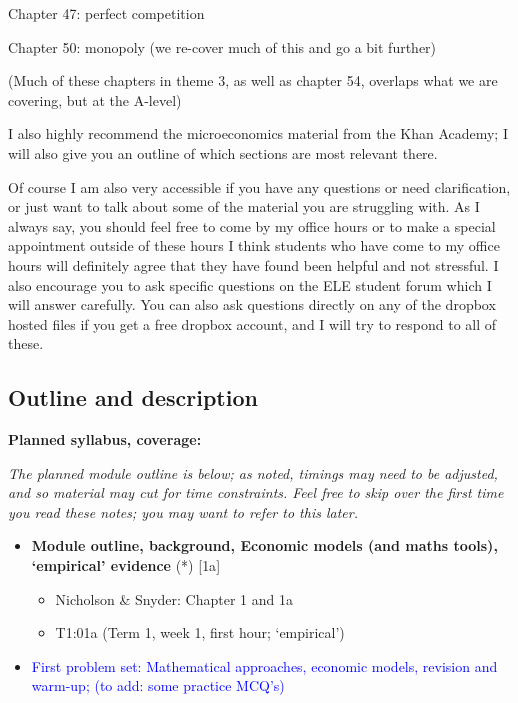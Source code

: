 \documentclass[]{article}
\providecommand{\tightlist}{%
  \setlength{\itemsep}{0pt}\setlength{\parskip}{0pt}}
\begin{document}
Chapter 47: perfect competition

Chapter 50: monopoly (we re-cover much of this and go a bit further)

(Much of these chapters in theme 3, as well as chapter 54, overlaps what we are covering, but at the A-level)

I also highly recommend the microeconomics material from the Khan Academy; I will also give you an outline of which sections are most relevant there.

Of course I am also very accessible if you have any questions or need clarification, or just want to talk about some of the material you are struggling with. As I always say, you should feel free to come by my office hours or to make a special appointment outside of these hours I think students who have come to my office hours will definitely agree that they have found been helpful and not stressful. I also encourage you to ask specific questions on the ELE student forum which I will answer carefully. You can also ask questions directly on any of the dropbox hosted files if you get a free dropbox account, and I will try to respond to all of these.

\hypertarget{outline-and-description}{%
\subsection{Outline and description}\label{outline-and-description}}

\textbf{Planned syllabus, coverage:}

\emph{The planned module outline is below; as noted, timings may need to be adjusted, and so material may cut for time constraints. Feel free to skip over the first time you read these notes; you may want to refer to this later.}

\begin{itemize}
\tightlist
\item
  \textbf{Module outline, background, Economic models (and maths tools), `empirical' evidence} (*) {[}1a{]}

  \begin{itemize}
  \tightlist
  \item
    Nicholson \& Snyder: Chapter 1 and 1a
  \item
    T1:01a (Term 1, week 1, first hour; `empirical')
  \end{itemize}
\item
  \textcolor{blue}{First problem set: Mathematical approaches, economic models, revision and warm-up; (to add: some practice MCQ's)}
\end{itemize}
\end{document}
